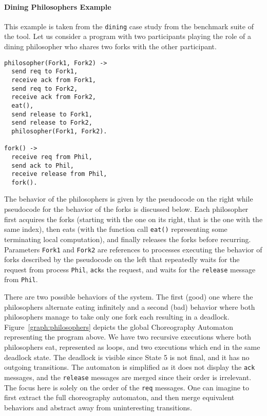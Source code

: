 \paragraph{Dining Philosophers Example}
This example is taken from the \texttt{dining} case study from the benchmark 
suite of the tool.
Let us consider a program with two participants playing the role of a
dining philosopher who shares two forks with the other participant.

\begin{lstlisting}
philosopher(Fork1, Fork2) ->
  send req to Fork1,
  receive ack from Fork1,
  send req to Fork2,
  receive ack from Fork2,
  eat(),
  send release to Fork1,
  send release to Fork2,
  philosopher(Fork1, Fork2).

fork() ->
  receive req from Phil,
  send ack to Phil,
  receive release from Phil,
  fork().
\end{lstlisting}

The behavior of the philosophers is given by the pseudocode on the
right while pseudocode for the behavior of the forks is discussed below.
Each philosopher first acquires the forks (starting with the one on
its right, that is the one with the same index), then eats (with the
function call \lstinline{eat()} representing some terminating local
computation), and finally releases the forks before recurring.
Parameters \lstinline{Fork1} and \lstinline{Fork2} are references to
processes executing the behavior of forks described by the pseudocode on the left
that repeatedly waits for the request from process \lstinline{Phil},
\lstinline{ack}s the request, and waits for the \lstinline{release}
message from \lstinline{Phil}.

There are two possible behaviors of the system. The first (good) one where the philosophers alternate eating infinitely and a second (bad) behavior 
where both philosophers
manage to take only one fork each
resulting in a deadlock. 
Figure~\ref{graph:philosophers} depicts the global Choreography Automaton
representing the program above. 
We have two recursive executions where both philosophers
eat, represented as loops, and two executions which end in the same
deadlock state.
The deadlock is 
visible since State 5 is not final, and it has no outgoing transitions.
The automaton is simplified 
as it does not display the \texttt{ack} messages, and the
\texttt{release} messages are merged since their order is
irrelevant. The focus here is solely on the order of the
\texttt{req} messages. One can imagine to first extract the full
choreography automaton, and then merge equivalent behaviors and abstract 
away from uninteresting transitions.


